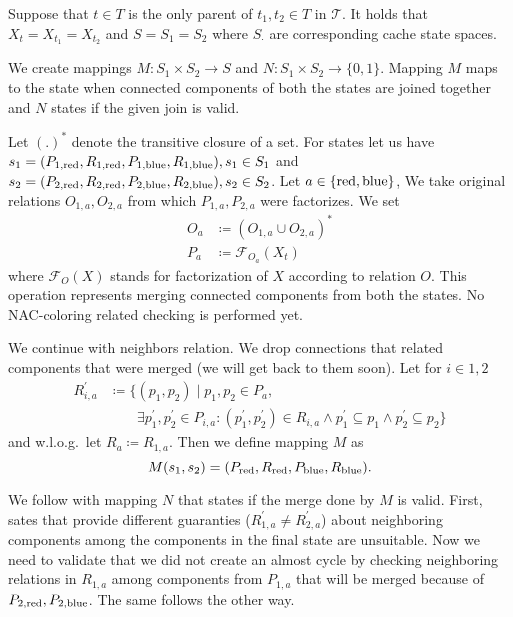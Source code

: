 Suppose that \( t \in T \) is
the only parent of \( t_1, t_2 \in T \) in \( \mathcal {T} \).
It holds that \( X_t = X_{t_1} = X_{t_2} \)
and \( S = S_1 = S_2 \) where \( S_\cdot \) are corresponding cache state spaces.

We create mappings \( M: S_1 \times S_2 \to S \) and \( N: S_1 \times S_2 \to \{0, 1\} \).
Mapping \( M \) maps to the state when connected components of both the states
are joined together and \( N \) states if the given join is valid.

Let \( {(.)}^* \) denote the transitive closure of a set.
For states let us have
\( s_1 = (P_{1,\text{red}}, R_{1,\text{red}}, P_{1,\text{blue}}, R_{1,\text{blue}}), s_1 \in S_1 \) and
\( s_2 = (P_{2,\text{red}}, R_{2,\text{red}}, P_{2,\text{blue}}, R_{2,\text{blue}}), s_2 \in S_2 \).
Let \( a \in \{\text{red}, \text{blue}\} \),
We take original relations \( O_{1, a}, O_{2, a} \)
from which \( P_{1, a}, P_{2, a} \) were factorizes.
We set
%
\begin{align*}
	O_a & \coloneqq {(O_{1, a} \cup O_{2, a})}^* \\
	P_a & \coloneqq \mathcal{F}_{O_a}(X_t)
\end{align*}
%
where \( \mathcal{F}_O(X) \) stands for factorization of \( X \)
according to relation \( O \). This operation represents merging connected
components from both the states. No NAC-coloring related checking is performed yet.

We continue with neighbors relation. We drop connections that related components
that were merged (we will get back to them soon).
Let for \( i \in {1, 2} \)
%
\begin{align*}
	R_{i,a}^\prime & \coloneqq \{(p_1, p_2) \mid p_1, p_2 \in P_a,                                                                                                            \\
	               & \qquad \exists p_1^\prime, p_2^\prime \in P_{i,a} : (p_1^\prime, p_2^\prime) \in R_{i,a} \land p_1^\prime \subseteq p_1 \land p_2^\prime \subseteq p_2\}
\end{align*}
%
and w.l.o.g.\ let \( R_a \coloneqq R_{1,a} \).
Then we define mapping \( M \) as \[ M(s_1, s_2) = (P_{\text{red}}, R_{\text{red}}, P_{\text{blue}}, R_{\text{blue}}). \]

We follow with mapping \( N \) that states if the merge done by \( M \) is valid.
First, sates that provide different guaranties
(\( R_{1,a}^\prime \not= R_{2,a}^\prime \)) about neighboring components
among the components in the final state are unsuitable.
Now we need to validate that we did not create an almost cycle by checking
neighboring relations in \( R_{1,a} \) among components from \( P_{1,a} \)
that will be merged because of \( P_{2,\text{red}}, P_{2,\text{blue}} \).
The same follows the other way.

